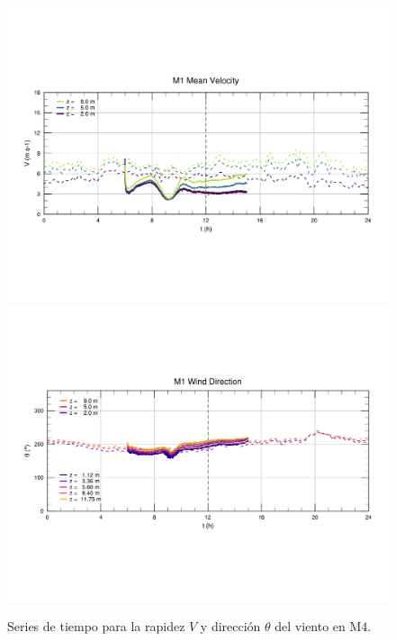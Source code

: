 \begin{figure}[H]
	\centering
	\includegraphics[width=0.87\linewidth,page=4,trim={9mm 57mm 10mm 60mm},clip]{Imagenes/06/bol/ts_interpol_compare.pdf}\\%
	\includegraphics[width=0.87\linewidth,page=4,trim={12mm 52mm 10mm 60mm},clip]{Imagenes/06/bol/ts_interpol_compare_o.pdf}%
	\vspace{-2mm}\caption{Series de tiempo para la rapidez $V$ y dirección $\theta$ del viento en M4.}
	\label{fig:06_bol_ts_m4}
\end{figure}
\vspace*{\fill}
\newpage
\vspace*{\fill}
